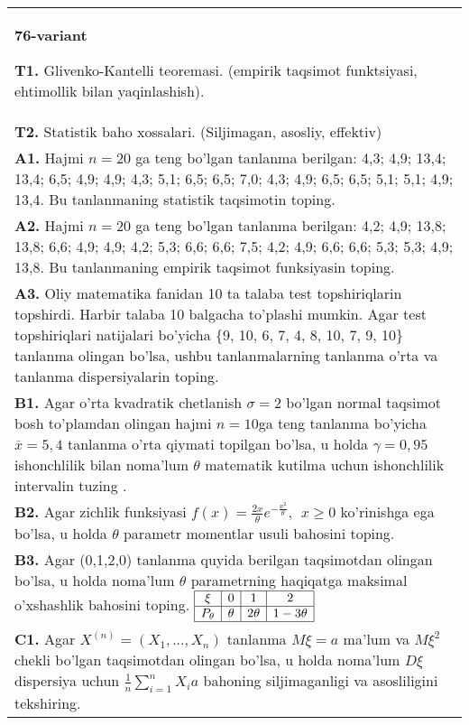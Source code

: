 \documentclass{article}
\begin{document}
\begin{tabular}{m{17cm}}
\textbf{76-variant}
\newline

\textbf{T1.} 
Glivenko-Kantelli teoremasi. (empirik taqsimot funktsiyasi, ehtimollik bilan yaqinlashish).
\\
\textbf{T2.} 
Statistik baho xossalari. (Siljimagan, asosliy, effektiv)
\\
\textbf{A1.} 
Hajmi \(n = 20\) ga teng bo'lgan tanlanma berilgan: 4,3; 4,9; 13,4; 13,4; 6,5; 4,9; 4,9; 4,3; 5,1; 6,5; 6,5; 7,0; 4,3; 4,9; 6,5; 6,5; 5,1; 5,1; 4,9; 13,4. Bu tanlanmaning statistik taqsimotin toping.
\\
\textbf{A2.} 
Hajmi \(n = 20\) ga teng bo'lgan tanlanma berilgan: 4,2; 4,9; 13,8; 13,8; 6,6; 4,9; 4,9; 4,2; 5,3; 6,6; 6,6; 7,5; 4,2; 4,9; 6,6; 6,6; 5,3; 5,3; 4,9; 13,8. Bu tanlanmaning empirik taqsimot funksiyasin toping.
\\
\textbf{A3.} 
Oliy matematika fanidan 10 ta talaba test topshiriqlarin topshirdi. Harbir talaba 10 balgacha to'plashi mumkin. Agar test topshiriqlari natijalari bo'yicha \{9, 10, 6, 7, 4, 8, 10, 7, 9, 10\} tanlanma olingan bo'lsa, ushbu tanlanmalarning tanlanma o'rta va tanlanma dispersiyalarin toping.
\\
\textbf{B1.} 
Agar o'rta kvadratik chetlanish \(\sigma = 2\) bo'lgan normal taqsimot bosh to'plamdan olingan hajmi \(n = 10\)ga teng tanlanma bo'yicha \(\overline{x} = 5,4\) tanlanma o'rta qiymati topilgan bo'lsa, u holda \(\gamma = 0,95\) ishonchlilik bilan noma'lum \(\theta\) matematik kutilma uchun ishonchlilik intervalin tuzing .
\\
\textbf{B2.} 
Agar zichlik funksiyasi \(f(x) = \frac{2x}{\theta}e^{- \frac{x^{2}}{\theta}},\ \ x \geq 0\) ko'rinishga ega bo'lsa, u holda \(\theta\) parametr momentlar usuli bahosini toping.
\\
\textbf{B3.} 
Agar (0,1,2,0) tanlanma quyida berilgan taqsimotdan olingan bo'lsa, u holda noma'lum \(\theta\) parametrning haqiqatga maksimal o'xshashlik bahosini toping.
$\begin{array}{|c|c|c|c|}
    \hline
    \xi & 0 & 1 & 2 \\
    \hline
    P_{\theta} & \theta & 2\theta & 1 - 3\theta \\
    \hline
\end{array}$
\\
\textbf{C1.} 
Agar \(X^{(n)} = \left( X_{1},...,X_{n} \right)\) tanlanma \(M\xi = a\) ma'lum va \(M\xi^{2}\) chekli bo'lgan taqsimotdan olingan bo'lsa, u holda noma'lum \(D\xi\) dispersiya uchun \(\frac{1}{n}\sum_{i = 1}^{n}{X_{i}a}\) bahoning siljimaganligi va asosliligini tekshiring.

\end{tabular}
\end{document}
